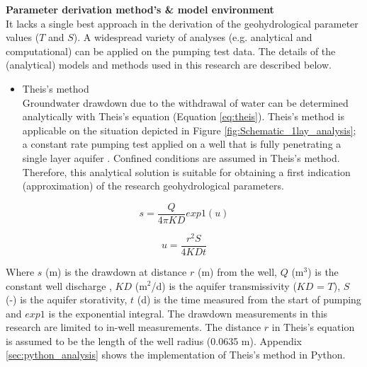 \textbf{Parameter derivation method's \& model environment} \\
It lacks a single best approach in the derivation of the geohydrological parameter values ($T$ and $S$). A widespread variety of analyses (e.g. analytical and computational) can be applied on the pumping test data. The details of the (analytical) models and methods used in this research are described below.

\begin{itemize}
\item{Theis's method} \\
Groundwater drawdown due to the withdrawal of water can be determined analytically with Theis's equation (Equation \ref{eq:theis}). Theis's method is applicable on the situation depicted in Figure  \ref{fig:Schematic_1lay_analysis}; a constant rate pumping test applied on a well that is fully penetrating a single layer aquifer \citep{Kruseman2000}. Confined conditions are assumed in Theis's method. Therefore, this analytical solution is suitable for obtaining a first indication (approximation) of the research geohydrological parameters.   
\end{itemize}


\begin{equation}
\label{eq:theis}
 s = \frac{Q}{4\pi K D} exp1(u)
\end{equation}

\begin{equation}
 u = \frac{r^{2} S}{4 K D t}
\end{equation}

Where $s$ (m) is the drawdown at distance $r$ (m) from the well, $Q$ (m$^{3}$) is the constant well discharge , $KD$ (m$^{2}$/d) is the aquifer transmissivity ($KD$ = $T$), $S$ (-) is the aquifer storativity, $t$ (d) is the time measured from the start of pumping and $exp1$ is the exponential integral. The drawdown measurements in this research are limited to in-well measurements. The distance $r$ in Theis's equation is assumed to be the length of the well radius (0.0635 m). Appendix \ref{sec:python_analysis} shows the implementation of Theis's method in Python.

